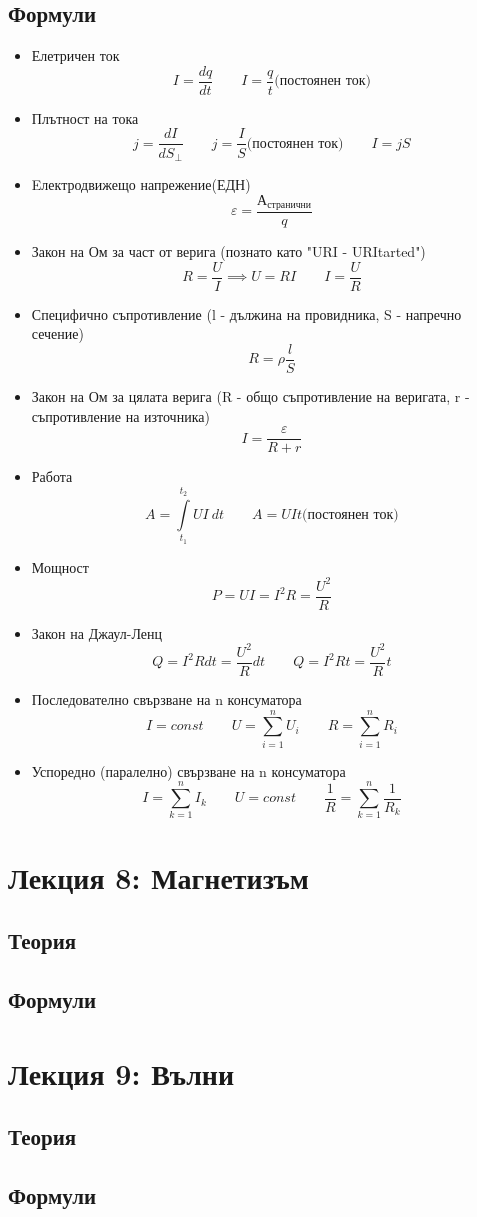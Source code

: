 \documentclass[fleqn, 12pt]{article}
\theoremstyle{definition}
\begin{document}
\subsection{Формули}
\begin{itemize}
\item Елетричен ток 
$$I = \frac{dq}{dt} \qquad I = \frac{q}{t} \text{(постоянен ток)}$$
\item Плътност на тока 
$$j = \frac{dI}{dS_{\perp}} \qquad j = \frac{I}{S} \text{(постоянен ток)} \qquad I = jS$$
\item Eлектродвижещо напрежение(ЕДН) 
$$\varepsilon = \frac{А_{\text{странични}}}{q}$$
\item Закон на Ом за част от верига (познато като "URI - URItarted")
$$R = \frac{U}{I} \implies U=RI \qquad I = \frac{U}{R}$$
\item Специфично съпротивление (l - дължина на провидника, S - напречно сечение)
$$R = \rho \frac{l}{S}$$
\item Закон на Ом за цялата верига (R - общо съпротивление на веригата, r - съпротивление на източника)
$$I = \frac{\varepsilon}{R + r}$$
\item Работа 
$$A = \int\limits_{t_1} ^{t_2} UI \ dt \qquad A = UIt \text{(постоянен ток)}$$
\item Мощност
$$P = UI = I^2R = \frac{U^2}{R}$$
\item Закон на Джаул-Ленц
$$Q = I^2Rdt = \frac{U^2}{R} dt \qquad Q = I^2Rt = \frac{U^2}{R}t $$
\item Последователно свързване на n консуматора
$$I = const \qquad U = \sum_{i=1} ^n U_i  \qquad R = \sum_{i=1} ^n R_i$$
\item Успоредно (паралелно) свързване на n консуматора 
$$I = \sum_{k=1} ^n I_k \qquad U = const \qquad \frac{1}{R} = \sum_{k=1} ^n \frac{1}{R_k}$$
\end{itemize}
\newpage
\section{Лекция 8: Магнетизъм}

\subsection{Теория}

\newpage
\subsection{Формули}

\newpage
\section{Лекция 9: Вълни}

\subsection{Теория}

\newpage
\subsection{Формули}
\end{document}
